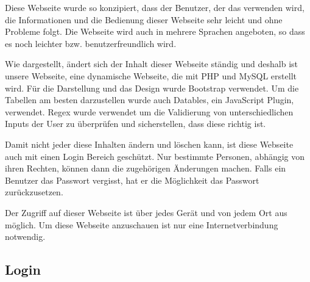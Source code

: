 Diese Webseite wurde so konzipiert, dass der Benutzer, der das verwenden wird, die Informationen und die Bedienung dieser Webseite sehr leicht und ohne Probleme folgt. Die Webseite wird auch in mehrere Sprachen angeboten, so dass es noch leichter bzw. benutzerfreundlich wird.

Wie dargestellt, \"{a}ndert sich der Inhalt dieser Webseite  st\"{a}ndig und deshalb ist unsere Webseite, eine dynamische Webseite, die mit PHP und MySQL erstellt wird. F\"{u}r die Darstellung und das Design wurde Bootstrap verwendet. Um die Tabellen am besten darzustellen wurde auch Datables, ein JavaScript Plugin, verwendet. Regex wurde verwendet um die Validierung von unterschiedlichen Inputs der User zu \"{u}berpr\"{u}fen und sicherstellen, dass diese richtig ist.


Damit nicht jeder diese Inhalten \"{a}ndern und l\"{o}schen kann, ist diese Webseite auch mit einen Login Bereich gesch\"{u}tzt. Nur bestimmte Personen, abh\"{a}ngig von ihren Rechten, k\"{o}nnen dann die zugeh\"{o}rigen \"{A}nderungen machen. Falls ein Benutzer das Passwort vergisst, hat er die M\"{o}glichkeit das Passwort zur\"{u}ckzusetzen.


Der Zugriff auf dieser Webseite ist \"uber jedes Ger\"{a}t und von jedem Ort aus m\"{o}glich. Um diese Webseite anzuschauen ist nur eine Internetverbindung notwendig.

\subsection{Login}

